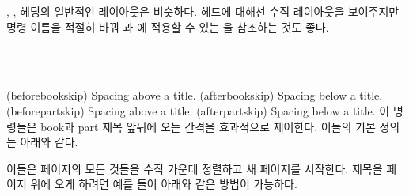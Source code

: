 \cmd{\book}, \cmd{\part}, \cmd{\chapter} 헤딩의 일반적인 레이아웃은 비슷하다.
 헤드에 대해선 수직 레이아웃을 보여주지만 명령 이름을 적절히 바꿔
\cmd{\book}과 \cmd{\part}에 적용할 수 있는 을 참조하는 것도 좋다.

\begin{syntax}
\cmd{\beforebookskip} \cmd{\afterbookskip} \\
\cmd{\beforepartskip} \cmd{\afterpartskip} \\
\end{syntax}
\glossary(beforebookskip)%
  {}%
  {Spacing above a  title.}
\glossary(afterbookskip)%
  {}%
  {Spacing below a  title.}
\glossary(beforepartskip)%
  {}%
  {Spacing above a  title.}
\glossary(afterpartskip)%
  {}%
  {Spacing below a  title.}
이 명령들은 book과 part 제목 앞뒤에 오는 간격을 효과적으로 제어한다. 이들의 기본
정의는 아래와 같다.
\begin{lcode}
\newcommand*{\beforebookskip}{\null\vfil}
\newcommand*{\afterbookskip}{\vfil\newpage}
\newcommand*{\beforepartskip}{\null\vfil}
\newcommand*{\afterpartskip}{\vfil\newpage}
\end{lcode}
이들은 페이지의 모든 것들을 수직 가운데 정렬하고 새 페이지를 시작한다. 
제목을 페이지 위에 오게 하려면 예를 들어 아래와 같은 방법이 가능하다.
\begin{lcode}
\renewcommand*{\beforepartskip}{\null\vskip 0pt plus 0.3fil}
\renewcommand*{\afterpartskip}{\vskip 0pt plus 0.7fil \newpage}
\end{lcode}

